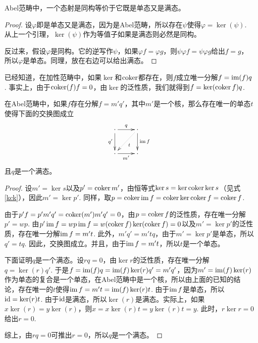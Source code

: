 \begin{pro}
Abel范畴中，一个态射是同构等价于它既是单态又是满态。
\end{pro}

\begin{proof}
设$\varphi$即是单态又是满态，因为是Abel范畴，所以存在$\psi$使得$\varphi=\ker(\psi)$. 从上一个引理，$\ker(\psi)$作为等值子如果是满态则必然是同构。

反过来，假设$\varphi$是同构。它的逆写作$\psi$，如果$\varphi f=\varphi g$，则$\psi\varphi f =\psi\varphi g$给出$f=g$，所以$\varphi$是单态。同理，放在右边可以给出满态。
\end{proof}

已经知道，在加性范畴中，如果$\ker$和$\operatorname{coker}$都存在，则$f$成立唯一分解$f=\operatorname{im}(f)q$. 事实上，由于$\operatorname{coker}(f)f=0$，由$\ker$的泛性质，我们就得到$f=\ker(\operatorname{coker} f)q$.

\begin{lem}\label{lem1}
在Abel范畴中，如果$f$存在分解$f=m'q'$，其中$m'$是一个核，那么存在唯一的单态$t$使得下面的交换图成立
\[
\begin{xy}
	\xymatrix{
	\cdot \ar[r]^q\ar[d]_{q'}& \cdot \ar[d]^{\im f}\ar@{.>}[dl]^t\\
	\cdot \ar[r]_{m'}& \cdot 
	}
\end{xy}
\]
且$q$是一个满态。
\end{lem}

\begin{proof}
设$m'=\ker s$以及$p'=\operatorname{coker} m'$，由恒等式$\ker s=\ker \operatorname{coker} \ker s$（见式\eqref{kck}），因此$m'=\ker p'$. 同样，取$p=\operatorname{coker} \operatorname{im} f=\operatorname{coker} \ker \operatorname{coker} f=\operatorname{coker} f$. 

由于$p'f=p'm'q'=\operatorname{coker}(m')m'q'=0$，由$p=\operatorname{coker} f$的泛性质，存在唯一分解$p'=wp$. 由$p'\operatorname{im} f=wp\operatorname{im} f=w (\operatorname{coker} f) \ker(\operatorname{coker} f)=0$以及$m'=\ker p'$的泛性质，存在唯一分解$\operatorname{im} f=m' t$. 此外，$m' q'=m'tq$，由于$m'=\ker p'$是单态，所以$q'=tq$. 因此，交换图成立。并且，由于$\operatorname{im} f=m't$，所以$t$是一个单态。

下面证明$q$是一个满态。设$rq=0$，由$\ker r$的泛性质，存在唯一分解$q=\ker (r) q'$. 于是$f=\operatorname{im}(f)q=\operatorname{im}(f)\ker (r) q'=m'q'$，因为$m'=\operatorname{im}(f)\ker (r)$作为单态的复合是一个单态，在Abel范畴中是一个核，所以由上面的已知的结论，存在唯一的$t$使得$\operatorname{im} f=m't=\operatorname{im}(f)\ker (r) t$. 由于$\operatorname{im} f$是单态，所以$\operatorname{id} =\ker (r) t$. 由于$\operatorname{id}$是满态，所以$\ker (r)$是满态。实际上，如果$x\ker(r)=y\ker(r)$，则$x=x\ker (r) t=y\ker (r) t=y$. 此时，$r\ker r=0$给出$r=0$. 

综上，由$rq=0$可推出$r=0$，所以$q$是一个满态。
\end{proof}

